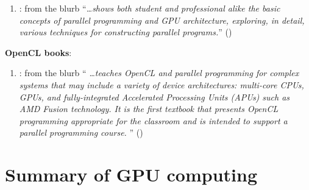 \begin{enumerate}
    \item \cite{kirk2016programming}: from the blurb ``\emph{\ldots shows both student and professional alike the basic concepts of parallel programming and GPU architecture, exploring, in detail, various techniques for constructing parallel programs.}'' (\faThumbsOUp{}\faThumbsOUp{}\faThumbsOUp{}) 
    
\end{enumerate}

{\bf OpenCL books}:

\begin{enumerate}
    \item \cite{gaster2012heterogeneous}: from the blurb ``\emph{ \ldots teaches OpenCL and parallel programming for complex systems that may include a variety of device architectures: multi-core CPUs, GPUs, and fully-integrated Accelerated Processing Units (APUs) such as AMD Fusion technology. It is the first textbook that presents OpenCL programming appropriate for the classroom and is intended to support a parallel programming course. }'' (\faThumbsOUp{})
\end{enumerate}

\section{Summary of GPU computing}


\printbibliography[heading=subbibliography]